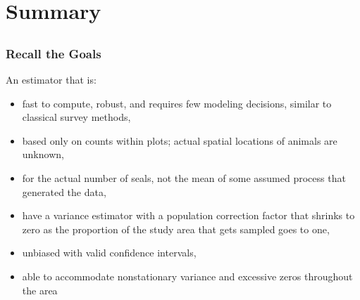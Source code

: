 \documentclass[mathserif,compress]{beamer}\usepackage{graphicx, color}
\begin{document}

\section{Summary}
\subsection{}
\begin{frame}[fragile]
\frametitle{Recall the Goals}

\footnotesize
	An estimator that is:
		\begin{itemize}
		\item fast to compute, robust, and requires few modeling decisions, similar to classical survey methods, 			\item based only on counts within plots; actual spatial locations of animals are unknown, 
		\item for the actual number of seals, not the mean of some assumed process that generated the data, 
		\item have a variance estimator with a population correction factor that shrinks to zero as the proportion of the study area that gets sampled goes to one, 
		\item unbiased with valid confidence intervals, 
		\item able to accommodate nonstationary variance and excessive zeros throughout the area
		\end{itemize}

\end{frame}
\end{document}
